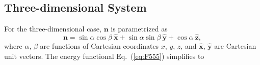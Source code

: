 \documentclass[nottitlepage]{article}
\begin{document}









\subsection{Three-dimensional System}
For the three-dimensional case, $\mathbf{n}$ is parametrized as
 \begin{equation}\label{eq:X}
 \mathbf{n}=\sin\alpha\cos\beta~\mathbf{\hat{x}}+\sin\alpha\sin\beta~\mathbf{\hat{y}}+\cos\alpha~\mathbf{\hat{z}},
 \end{equation}
 where $\alpha$, $\beta$ are functions of Cartesian coordinates $x$, $y$, $z$, and $\mathbf{\hat{x}}$, $\mathbf{\hat{y}}$ are Cartesian unit vectors. The energy functional Eq.~(\ref{eq:F555}) simplifies to
 
\end{document}
